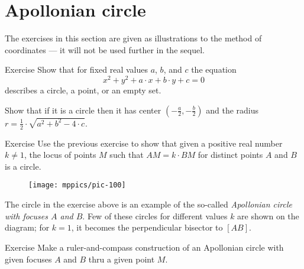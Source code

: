 \section{Apollonian circle}

The exercises in this section are given as illustrations to the method of coordinates --- it will not be used further in the sequel.

\begin{thm}{Exercise}\label{ex:circle-coord}
Show that for fixed real values $a$, $b$, and $c$ the equation 
\[x^2+y^2+a\cdot x+b\cdot y+c=0\]
describes a circle, a point, or an empty set.

Show that if it is a circle then it has center $(-\tfrac a2,-\tfrac b2)$ and the radius $r=\tfrac12\cdot \sqrt{a^2+b^2-4\cdot c}$.
\end{thm}

\begin{thm}{Exercise}\label{ex:apolonnius}
Use the previous exercise to show that given a positive real number $k\ne1$,
the locus of points $M$ such that $AM=k\cdot BM$ 
for distinct points $A$ and $B$
is a circle. 
\end{thm}

\begin{figure}[!ht]
\centering
\texttt{[image: mppics/pic-100]}
\end{figure}

The circle in the exercise above is an example of the so-called \emph{Apollonian circle with focuses $A$ and $B$}.
Few of these circles for different values $k$ are shown on the diagram; for $k=1$, it becomes the perpendicular bisector to $[AB]$.


\begin{thm}{Exercise}\label{ex:apolonnius-construction}
Make a ruler-and-compass construction of an Apollonian circle with given focuses $A$ and $B$ thru a given point $M$.
\end{thm}
